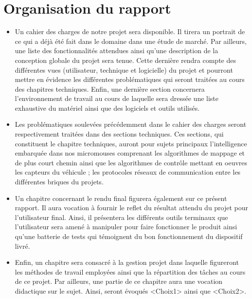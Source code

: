 \section{Organisation du rapport} \label{sec:organisation}

\begin{itemize}
	\item Un cahier des charges de notre projet sera disponible. Il tirera un portrait 
de ce qui a déjà été fait dans le domaine dans une étude de marché. Par ailleurs, 
une liste des fonctionnalités attendues ainsi qu'une description de la conception 
globale du projet sera tenue. Cette dernière rendra compte des différentes vues 
(utilisateur, technique et logicielle) du projet et pourront mettre en évidence les 
différentes problématiques qui seront traitées au cours des chapitres techniques. 
Enfin, une dernière section concernera l'environnement de travail au cours de laquelle 
sera dressée une liste exhaustive du matériel ainsi que des logiciels et outils utilisés.\\


	\item Les problématiques soulevées précédemment dans le cahier des charges seront 
respectivement traitées dans des sections techniques. Ces sections, qui constituent 
le chapitre techniques, auront pour sujets principaux l'intelligence embarquée dans 
nos micromouses comprenant les algorithmes de mappage et de plus court chemin ainsi 
que les algorithmes de contrôle mettant en oeuvres les capteurs du véhicule ; les protocoles 
réseaux de communication entre les différentes briques du projets. \\


	\item Un chapitre concernant le rendu final figurera également sur ce présent rapport. 
Il aura vocation à fournir le reflet du résultat attendu du projet pour l'utilisateur 
final. Ainsi, il présentera les différents outils terminaux que l'utilisateur sera amené 
à manipuler pour faire fonctionner le produit ainsi qu'une batterie de tests qui témoignent 
du bon fonctionnement du dispositif livré. \\


	\item Enfin, un chapitre sera consacré à la gestion projet dans laquelle figureront les méthodes 
de travail employées ainsi que la répartition des tâches au cours de ce projet. 
Par ailleurs, une partie de ce chapitre aura une vocation didactique sur le sujet. 
Ainsi, seront évoqués <Choix1> ainsi que <Choix2>. \\
\end{itemize}
